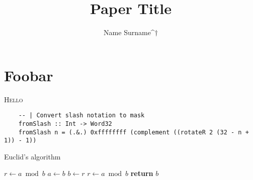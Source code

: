 \documentclass{report}%
\title{Paper Title}
\author{Name Surname^$\dagger$}
\affil{Institution^$\dagger$}
\begin{document}
\maketitle%

\begin{abstract}
  \blindtext%
\end{abstract}

\section{Foobar}

\lettrine{H}{ello}
\Blindtext%


\blindtext%

\begin{strip}
  \centering\noindent
  \begin{verbatim}
    -- | Convert slash notation to mask
    fromSlash :: Int -> Word32
    fromSlash n = (.&.) 0xffffffff (complement ((rotateR 2 (32 - n + 1)) - 1))
  \end{verbatim}
\end{strip}

\Blindtext%

\begin{algorithm*}
  \caption{Euclid’s algorithm}\label{euclid}
  \begin{algorithmic}[1]
      \State $r\gets a\bmod b$
        \State $a\gets b$
        \State $b\gets r$
        \State $r\gets a\bmod b$
      \EndWhile\label{euclidendwhile}
      \State \textbf{return} $b$
    \EndProcedure
  \end{algorithmic}
\end{algorithm*}

\Blindtext%
\end{document}
